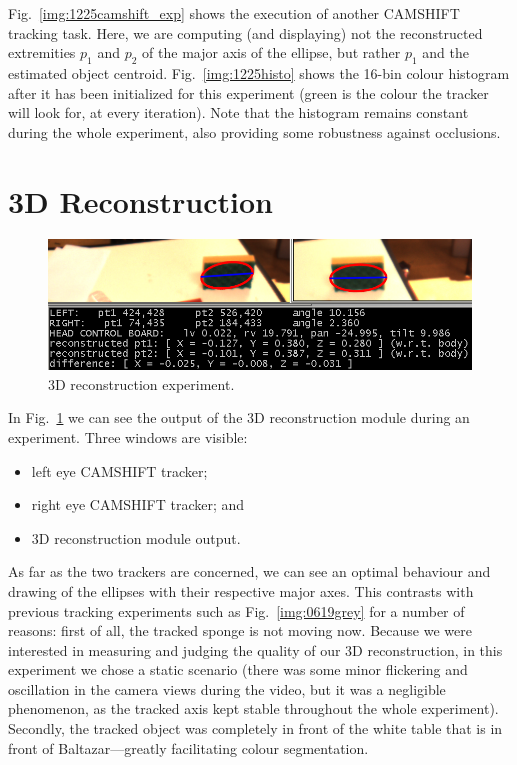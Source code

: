 Fig.~\ref{img:1225camshift_exp} shows the execution of another \ac{CAMSHIFT} tracking task. Here, we are computing (and displaying) not the reconstructed extremities $p_1$ and $p_2$ of the major axis of the ellipse, but rather $p_1$ and the estimated object centroid. Fig.~\ref{img:1225histo} shows the 16-bin colour histogram after it has been initialized for this experiment (green is the colour the tracker will look for, at every iteration). Note that the histogram remains constant during the whole experiment, also providing some robustness against occlusions.


\section{3D Reconstruction}

\begin{figure}[h]
\centering
\includegraphics[scale=0.4]{figures/0509recon}
\caption[3D reconstruction experiment]{3D reconstruction experiment.}
\label{img:0509recon}
\end{figure}

In Fig.~\ref{img:0509recon} we can see the output of the 3D reconstruction module during an experiment. Three windows are visible:
\begin{itemize}
\item left eye \ac{CAMSHIFT} tracker;

\item right eye \ac{CAMSHIFT} tracker; and

\item 3D reconstruction module output.
\end{itemize}

As far as the two trackers are concerned, we can see an optimal behaviour and drawing of the ellipses with their respective major axes. This contrasts with previous tracking experiments such as Fig.~\ref{img:0619grey} for a number of reasons: first of all, the tracked sponge is not moving now. Because we were interested in measuring and judging the quality of our 3D reconstruction, in this experiment we chose a static scenario (there was some minor flickering and oscillation in the camera views during the video, but it was a negligible phenomenon, as the tracked axis kept stable throughout the whole experiment). Secondly, the tracked object was completely in front of the white table that is in front of Baltazar---greatly facilitating colour segmentation.

